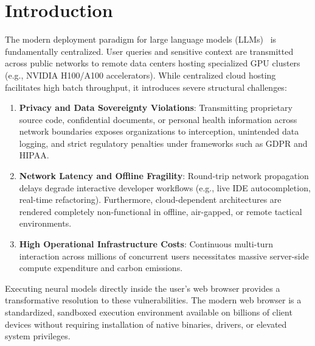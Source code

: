 \documentclass[11pt,a4paper]{article}
\theoremstyle{plain}
\theoremstyle{definition}
\theoremstyle{remark}
\begin{document}
\newpage
\tableofcontents
\newpage

\section{Introduction}
\label{sec:intro}

The modern deployment paradigm for large language models (LLMs)~\cite{vaswani2017attention} is fundamentally centralized. User queries and sensitive context are transmitted across public networks to remote data centers hosting specialized GPU clusters (e.g., NVIDIA H100/A100 accelerators). While centralized cloud hosting facilitates high batch throughput, it introduces severe structural challenges:

\begin{enumerate}[leftmargin=*]
    \item \textbf{Privacy and Data Sovereignty Violations}: Transmitting proprietary source code, confidential documents, or personal health information across network boundaries exposes organizations to interception, unintended data logging, and strict regulatory penalties under frameworks such as GDPR and HIPAA.
    \item \textbf{Network Latency and Offline Fragility}: Round-trip network propagation delays degrade interactive developer workflows (e.g., live IDE autocompletion, real-time refactoring). Furthermore, cloud-dependent architectures are rendered completely non-functional in offline, air-gapped, or remote tactical environments.
    \item \textbf{High Operational Infrastructure Costs}: Continuous multi-turn interaction across millions of concurrent users necessitates massive server-side compute expenditure and carbon emissions.
\end{enumerate}

Executing neural models directly inside the user's web browser provides a transformative resolution to these vulnerabilities. The modern web browser is a standardized, sandboxed execution environment available on billions of client devices without requiring installation of native binaries, drivers, or elevated system privileges.
\end{document}
